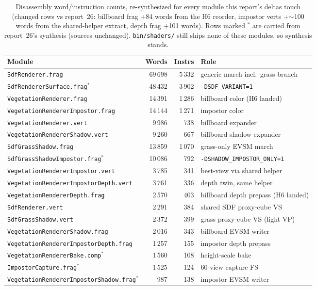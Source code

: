 \documentclass[11pt,a4paper]{article}
\begin{document}
\begin{table}[h]
\centering
\small
\begin{tabular}{@{}lrrl@{}}
\toprule
\textbf{Module} & \textbf{Words} & \textbf{Instrs} & \textbf{Role} \\
\midrule
\texttt{SdfRenderer.frag} & 69\,698 & 5\,332 & generic march incl.\ grass branch \\
\texttt{SdfRendererSurface.frag}$^*$ & 48\,432 & 3\,902 & \texttt{-DSDF\_VARIANT=1} \\
\texttt{VegetationRenderer.frag} & 14\,391 & 1\,286 & billboard color (H6 landed) \\
\texttt{VegetationRendererImpostor.frag} & 14\,144 & 1\,271 & impostor color \\
\texttt{VegetationRenderer.vert} & 9\,986 & 738 & billboard expander \\
\texttt{VegetationRendererShadow.vert} & 9\,260 & 667 & billboard shadow expander \\
\texttt{SdfGrassShadow.frag} & 13\,859 & 1\,070 & grass-only EVSM march \\
\texttt{SdfGrassShadowImpostor.frag}$^*$ & 10\,086 & 792 & \texttt{-DSHADOW\_IMPOSTOR\_ONLY=1} \\
\texttt{VegetationRendererImpostor.vert} & 3\,785 & 341 & best-view via shared helper \\
\texttt{VegetationRendererImpostorDepth.vert} & 3\,761 & 336 & depth twin, same helper \\
\texttt{VegetationRendererDepth.frag} & 2\,570 & 403 & billboard depth prepass (H6 landed) \\
\texttt{SdfRenderer.vert} & 2\,291 & 384 & shared SDF proxy-cube VS \\
\texttt{SdfGrassShadow.vert} & 2\,372 & 399 & grass proxy-cube VS (light VP) \\
\texttt{VegetationRendererShadow.frag} & 2\,016 & 343 & billboard EVSM writer \\
\texttt{VegetationRendererImpostorDepth.frag} & 1\,257 & 155 & impostor depth prepass \\
\texttt{VegetationRendererBake.comp}$^*$ & 1\,560 & 108 & height-scale bake \\
\texttt{ImpostorCapture.frag}$^*$ & 1\,525 & 124 & 60-view capture FS \\
\texttt{VegetationRendererImpostorShadow.frag}$^*$ & 987 & 138 & impostor EVSM writer \\
\bottomrule
\end{tabular}
\caption{Disassembly word/instruction counts, re-synthesized for every
module this report's deltas touch (changed rows vs report~26: billboard
frag +84 words from the H6 reorder, impostor verts +$\sim$100 words from
the shared-helper extract, depth frag +101 words). Rows marked $^*$ are
carried from report~26's synthesis (sources unchanged). \texttt{bin/shaders/}
still ships none of these modules, so synthesis stands.}
\end{table}
\end{document}
